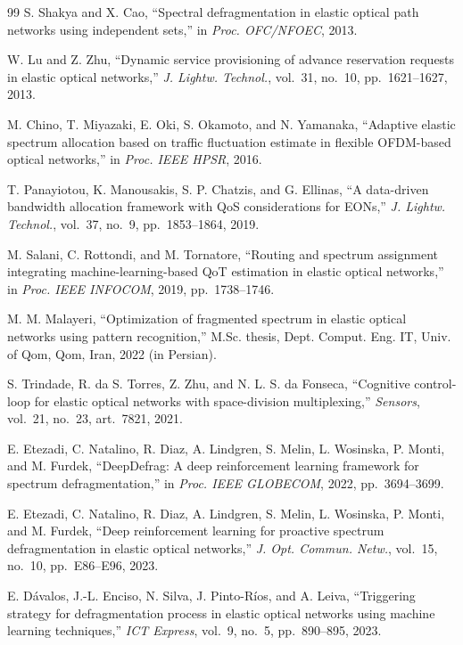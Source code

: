 \documentclass[conference]{IEEEtran}
\begin{document}
\begin{thebibliography}{99}
S. Shakya and X. Cao, ``Spectral defragmentation in elastic optical path networks using independent sets,'' in \textit{Proc. OFC/NFOEC}, 2013.

W. Lu and Z. Zhu, ``Dynamic service provisioning of advance reservation requests in elastic optical networks,'' \textit{J. Lightw. Technol.}, vol.~31, no.~10, pp.~1621--1627, 2013.

M. Chino, T. Miyazaki, E. Oki, S. Okamoto, and N. Yamanaka, ``Adaptive elastic spectrum allocation based on traffic fluctuation estimate in flexible OFDM-based optical networks,'' in \textit{Proc. IEEE HPSR}, 2016.

T. Panayiotou, K. Manousakis, S. P. Chatzis, and G. Ellinas, ``A data-driven bandwidth allocation framework with QoS considerations for EONs,'' \textit{J. Lightw. Technol.}, vol.~37, no.~9, pp.~1853--1864, 2019.

M. Salani, C. Rottondi, and M. Tornatore, ``Routing and spectrum assignment integrating machine-learning-based QoT estimation in elastic optical networks,'' in \textit{Proc. IEEE INFOCOM}, 2019, pp.~1738--1746.

M. M. Malayeri, ``Optimization of fragmented spectrum in elastic optical networks using pattern recognition,'' M.Sc. thesis, Dept. Comput. Eng. IT, Univ. of Qom, Qom, Iran, 2022 (in Persian).

S. Trindade, R. da S. Torres, Z. Zhu, and N. L. S. da Fonseca, ``Cognitive control-loop for elastic optical networks with space-division multiplexing,'' \textit{Sensors}, vol.~21, no.~23, art.~7821, 2021.

E. Etezadi, C. Natalino, R. Diaz, A. Lindgren, S. Melin, L. Wosinska, P. Monti, and M. Furdek, ``DeepDefrag: A deep reinforcement learning framework for spectrum defragmentation,'' in \textit{Proc. IEEE GLOBECOM}, 2022, pp.~3694--3699.

E. Etezadi, C. Natalino, R. Diaz, A. Lindgren, S. Melin, L. Wosinska, P. Monti, and M. Furdek, ``Deep reinforcement learning for proactive spectrum defragmentation in elastic optical networks,'' \textit{J. Opt. Commun. Netw.}, vol.~15, no.~10, pp.~E86--E96, 2023.

E. D\'avalos, J.-L. Enciso, N. Silva, J. Pinto-R\'ios, and A. Leiva, ``Triggering strategy for defragmentation process in elastic optical networks using machine learning techniques,'' \textit{ICT Express}, vol.~9, no.~5, pp.~890--895, 2023.

\end{thebibliography}
\end{document}
